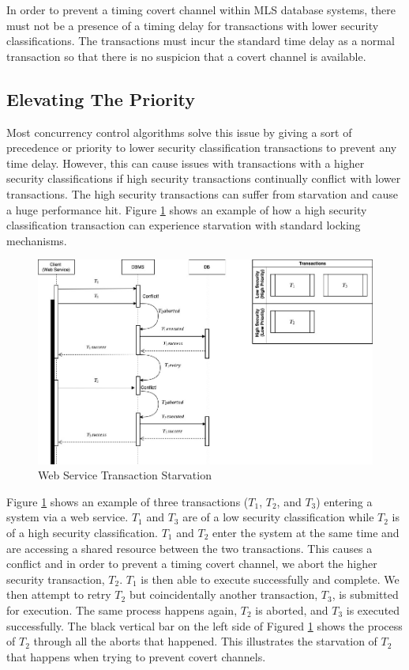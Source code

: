 In order to prevent a timing covert channel within MLS database systems, there must not be a presence of a timing delay for transactions with lower security classifications. The transactions must incur the standard time delay as a normal transaction so that there is no suspicion that a covert channel is available.

\subsection{Elevating The Priority}
\label{mls:problem_definition_elevation}
Most concurrency control algorithms solve this issue by giving a sort of precedence or priority to lower security classification transactions to prevent any time delay. However, this can cause issues with transactions with a higher security classifications if high security transactions continually conflict with lower transactions. The high security transactions can suffer from starvation and cause a huge performance hit. Figure \ref{fig:ws_trans_starvation} shows an example of how a high security classification transaction can experience starvation with standard locking mechanisms.

\begin{figure}
\centering
\includegraphics[scale=0.45]{images/TransactionStarvation.jpg}
\caption{Web Service Transaction Starvation}
\label{fig:ws_trans_starvation}
\end{figure}

Figure \ref{fig:ws_trans_starvation} shows an example of three transactions ($T_1$, $T_2$, and $T_3$) entering a system via a web service. $T_1$ and $T_3$ are of a low security classification while $T_2$ is of a high security classification. $T_1$ and $T_2$ enter the system at the same time and are accessing a shared resource between the two transactions. This causes a conflict and in order to prevent a timing covert channel, we abort the higher security transaction, $T_2$. $T_1$ is then able to execute successfully and complete. We then attempt to retry $T_2$ but coincidentally another transaction, $T_3$, is submitted for execution. The same process happens again, $T_2$ is aborted, and $T_3$ is executed successfully. The black vertical bar on the left side of Figured \ref{fig:ws_trans_starvation} shows the process of $T_2$ through all the aborts that happened. This illustrates the starvation of $T_2$ that happens when trying to prevent covert channels.

